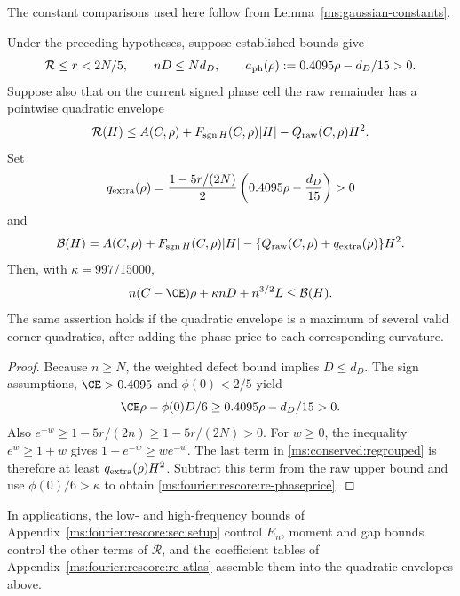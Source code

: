 The constant comparisons used here follow from
Lemma~\ref{ms:gaussian-constants}.

\begin{corollary}\label{ms:conserved:phase-resource}
Under the preceding hypotheses, suppose established bounds give
\[
 \mathcal R\le r<2N/5,\qquad nD\le Nd_D,\qquad
 a_{\rm ph}(\rho):=0.4095\rho-d_D/15>0.
\]
Suppose also that on the current signed phase cell the raw remainder
has a pointwise quadratic envelope
\[
 \mathcal R(H)\le A(C,\rho)+F_{\operatorname{sgn}H}(C,\rho)|H|
                  -Q_{\rm raw}(C,\rho)H^2.
\]
Set
\begin{equation}\label{ms:fourier:rescore:re-extra}
 q_{\rm extra}(\rho)=\frac{1-5r/(2N)}2
                   \left(0.4095\rho-\frac{d_D}{15}\right)>0
\end{equation}
and
\[
 \mathcal B(H)=A(C,\rho)+F_{\operatorname{sgn}H}(C,\rho)|H|
                -\{Q_{\rm raw}(C,\rho)+q_{\rm extra}(\rho)\}H^2.
\]
Then, with $\kappa=997/15000$,
\begin{equation}\label{ms:fourier:rescore:re-phaseprice}
 n(C-\CE)\rho+\kappa nD+n^{3/2}L\le\mathcal B(H).
\end{equation}
The same assertion holds if the quadratic envelope is a maximum of
several valid corner quadratics, after adding the phase price to each
corresponding curvature.
\end{corollary}
\begin{proof}
Because $n\ge N$, the weighted defect bound implies $D\le d_D$.
The sign assumptions, $\CE>0.4095$ and $\phi(0)<2/5$ yield
\[
 \CE\rho-\phi(0)D/6\ge0.4095\rho-d_D/15>0.
\]
Also $e^{-w}\ge1-5r/(2n)\ge1-5r/(2N)>0$.
For $w\ge0$, the inequality $e^w\ge1+w$ gives
$1-e^{-w}\ge we^{-w}$. The last term in
\eqref{ms:conserved:regrouped} is therefore at least
$q_{\rm extra}(\rho)H^2$. Subtract this term from the raw upper bound
and use $\phi(0)/6>\kappa$ to obtain
\eqref{ms:fourier:rescore:re-phaseprice}.
\end{proof}

In applications, the low- and high-frequency bounds of
Appendix~\ref{ms:fourier:rescore:sec:setup} control $E_n$, moment and gap
bounds control the other terms of $\mathcal R$, and the coefficient tables
of Appendix~\ref{ms:fourier:rescore:re-atlas} assemble them into the
quadratic envelopes above.
